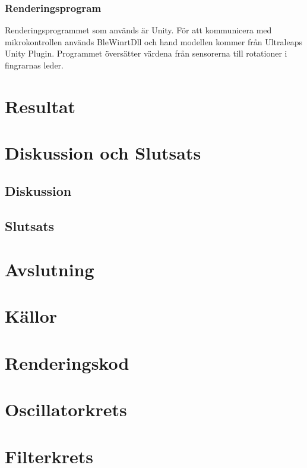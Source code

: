 \documentclass[a4paper]{article}
\begin{document}
\begin{sloppypar}
    \subsubsection{Renderingsprogram}
    Renderingsprogrammet som används är Unity.
    För att kommunicera med mikrokontrollen används BleWinrtDll och hand modellen kommer från Ultraleaps Unity Plugin.
    Programmet översätter värdena från sensorerna till rotationer i fingrarnas leder.





    \section{Resultat}
    \section{Diskussion och Slutsats}
    \subsection{Diskussion}

    \subsection{Slutsats}

    \section{Avslutning}




    \section{Källor}
    \printbibliography[heading=none]


    \appendices
    \titleformat{\section}[display]
    {\normalfont\Large\bfseries}{\appendixname\enspace\thesection}{.5em}{} %
    \section{Renderingskod}

    \section{Oscillatorkrets}

    \section{Filterkrets}


\end{sloppypar}
\end{document}
